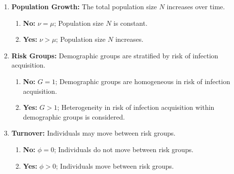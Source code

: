 \begin{fboxed}
  \small
  \begin{enumerate}[leftmargin=1em]
    \item\label{ass:pop-growth}\textbf{Population Growth:}
    The total population size $N$ increases over time.
    \begin{enumerate}
      \item\textbf{No:} $\nu = \mu$;
      Population size $N$ is constant.
      \item\textbf{Yes:} $\nu > \mu$;
      Population size $N$ increases. %
    \end{enumerate}
    \item\label{ass:risk-groups}\textbf{Risk Groups:}
    Demographic groups are stratified by risk of infection acquisition.
    \begin{enumerate}
      \item\label{ass:risk-groups-no}\textbf{No:} $G = 1$;
      Demographic groups are homogeneous in risk of infection acquisition.
      \item\label{ass:risk-groups-yes}\textbf{Yes:} $G > 1$;
      Heterogeneity in risk of infection acquisition within demographic groups is considered.
    \end{enumerate}
    \item\label{ass:turnover}\textbf{Turnover:}
    Individuals may move between risk groups.
    \begin{enumerate}
      \item\textbf{No:} $\phi = 0$;
      Individuals do not move between risk groups.
      \item\textbf{Yes:} $\phi > 0$;
      Individuals move between risk groups. %
    \end{enumerate}
  \end{enumerate}
\end{fboxed}
